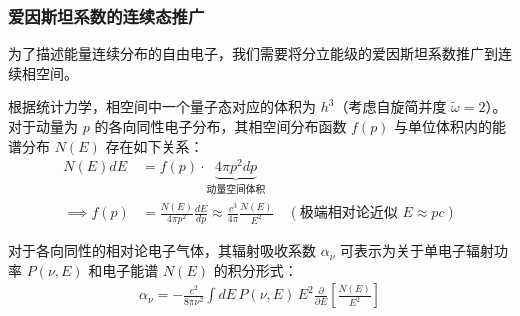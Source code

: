 \subsubsection{爱因斯坦系数的连续态推广}

为了描述能量连续分布的自由电子，我们需要将分立能级的爱因斯坦系数推广到连续相空间。

\begin{definition}[相空间量子化]
    根据统计力学，相空间中一个量子态对应的体积为 $h^3$（考虑自旋简并度 $\tilde{\omega}=2$）。对于动量为 $p$ 的各向同性电子分布，其相空间分布函数 $f(p)$ 与单位体积内的能谱分布 $N(E)$ 存在如下关系：
    \begin{align}
        N(E) dE &= f(p) \cdot \underbrace{4\pi p^2 dp}_{\text{动量空间体积}} \label{eq:number_density_relation} \\
        \implies f(p) &= \frac{N(E)}{4\pi p^2} \frac{dE}{dp} \approx \frac{c^3}{4\pi} \frac{N(E)}{E^2} \quad (\text{极端相对论近似 } E \approx pc) \label{eq:f_p_relation}
    \end{align}
\end{definition}

\begin{theorem}[连续态电子的吸收系数]
    对于各向同性的相对论电子气体，其辐射吸收系数 $\alpha_{\nu}$ 可表示为关于单电子辐射功率 $P(\nu, E)$ 和电子能谱 $N(E)$ 的积分形式：
    \begin{align}
        \alpha_{\nu} = - \frac{c^2}{8\pi \nu^2} \int dE \, P(\nu, E) \, E^2 \frac{\partial}{\partial E} \left[ \frac{N(E)}{E^2} \right] \label{eq:general_alpha}
    \end{align}
\end{theorem}

